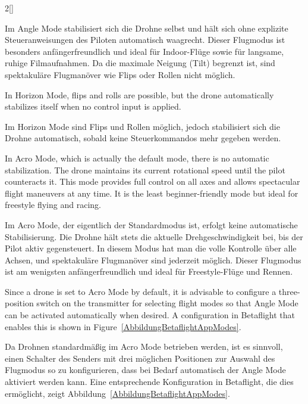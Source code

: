 \begin{paracol}{2}[]
\colger

Im Angle Mode stabilisiert sich die Drohne selbst und hält sich ohne explizite Steueranweisungen des Piloten automatisch waagrecht. Dieser Flugmodus ist besonders anfängerfreundlich und ideal für Indoor-Flüge sowie für langsame, ruhige Filmaufnahmen. Da die maximale Neigung (Tilt) begrenzt ist, sind spektakuläre Flugmanöver wie Flips oder Rollen nicht möglich.
 
\coleng

In Horizon Mode, flips and rolls are possible, but the drone automatically stabilizes itself when no control input is applied.

\colger

Im Horizon Mode sind Flips und Rollen möglich, jedoch stabilisiert sich die Drohne automatisch, sobald keine Steuerkommandos mehr gegeben werden.

\coleng

In Acro Mode, which is actually the default mode, there is no automatic stabilization. The drone maintains its current rotational speed until the pilot counteracts it. This mode provides full control on all axes and allows spectacular flight maneuvers at any time. It is the least beginner-friendly mode but ideal for freestyle flying and racing.

\colger

Im Acro Mode, der eigentlich der Standardmodus ist, erfolgt keine automatische Stabilisierung. Die Drohne hält stets die aktuelle Drehgeschwindigkeit bei, bis der Pilot aktiv gegensteuert. In diesem Modus hat man die volle Kontrolle über alle Achsen, und spektakuläre Flugmanöver sind jederzeit möglich. Dieser Flugmodus ist am wenigsten anfängerfreundlich und ideal für Freestyle-Flüge und Rennen.

\coleng

Since a drone is set to Acro Mode by default, it is advisable to configure a three-position switch on the transmitter for selecting flight modes so that Angle Mode can be activated automatically when desired. A configuration in Betaflight that enables this is shown in Figure~\ref{AbbildungBetaflightAppModes}.

\colger

Da Drohnen standardmäßig im Acro Mode betrieben werden, ist es sinnvoll, einen Schalter des Senders mit drei möglichen Positionen zur Auswahl des Flugmodus so zu konfigurieren, dass bei Bedarf automatisch der Angle Mode aktiviert werden kann. Eine entsprechende Konfiguration in Betaflight, die dies ermöglicht, zeigt Abbildung~\ref{AbbildungBetaflightAppModes}.


\end{paracol}
